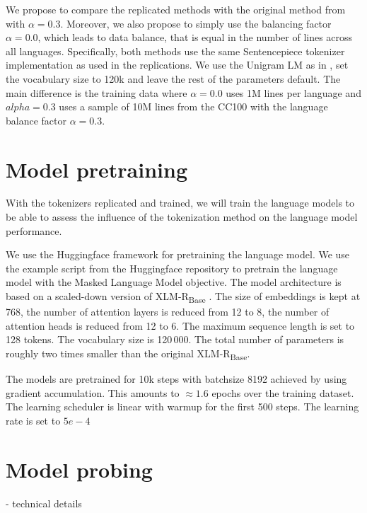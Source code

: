 We propose to compare the replicated methods with the original method from \citet{conneau_unsupervised_2020} with $\alpha=0.3$. Moreover, we also propose to simply use the balancing factor $\alpha=0.0$, which leads to data balance, that is equal in the number of lines across all languages. 
Specifically, both methods use the same Sentencepiece tokenizer implementation as used in the replications. We use the Unigram LM as in \citet{conneau_unsupervised_2020}, set the vocabulary size to 120k and leave the rest of the parameters default. The main difference is the training data where $\alpha=0.0$ uses 1M lines per language and $alpha=0.3$ uses a sample of 10M lines from the CC100 with the language balance factor $\alpha=0.3$. 


\section{Model pretraining}

With the tokenizers replicated and trained, we will train the language models to be able to assess the influence of the tokenization method on the language model performance.

We use the Huggingface framework \cite{wolf_transformers_2020} for pretraining the language model. We use the example script from the Huggingface repository to pretrain the language model with the Masked Language Model objective. The model architecture is based on a scaled-down version of XLM-R\textsubscript{Base} \cite{conneau_unsupervised_2020}. The size of embeddings is kept at 768, the number of attention layers is reduced from 12 to 8, the number of attention heads is reduced from 12 to 6. The maximum sequence length is set to 128 tokens. The vocabulary size is 120\,000. The total number of parameters is roughly two times smaller than the original XLM-R\textsubscript{Base}.

The models are pretrained for 10k steps with batchsize 8192 achieved by using gradient accumulation. This amounts to $\approx 1.6$ epochs over the training dataset. The learning scheduler is linear with warmup for the first 500 steps. The learning rate is set to $5e-4$

\section{Model probing}

- technical details

